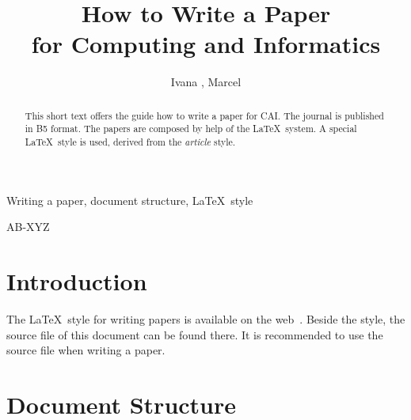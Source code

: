 \documentclass{cai}
\begin{document}
\label{firstpage}

\title[How to Write a Paper for CAI]
      {How to Write a Paper\\ for Computing and Informatics}

\author[I.~Ja\v{s}\v{s}ov\'a, M.~Tak\'a\v{c}]
       {Ivana , Marcel }




%
%

\noreceived{} \nocommunicated{}

\maketitle

\begin{abstract}
This short text offers the guide how to write a paper for CAI. The journal is published in B5 format. The
papers are composed by help of the \LaTeX\ system. A special \LaTeX\ style is used, derived from the
\textit{article} style.
\end{abstract}

\begin{keywords}
Writing a paper, document structure, \LaTeX\ style
\end{keywords}

\begin{mathclass}
AB-XYZ
\end{mathclass}


\section{Introduction}

The \LaTeX\ style for writing papers is available on the web~\cite{cai-style}. Beside the style, the source
file of this document can be found there. It is recommended to use the source file when writing a paper.


\section{Document Structure}
\end{document}
